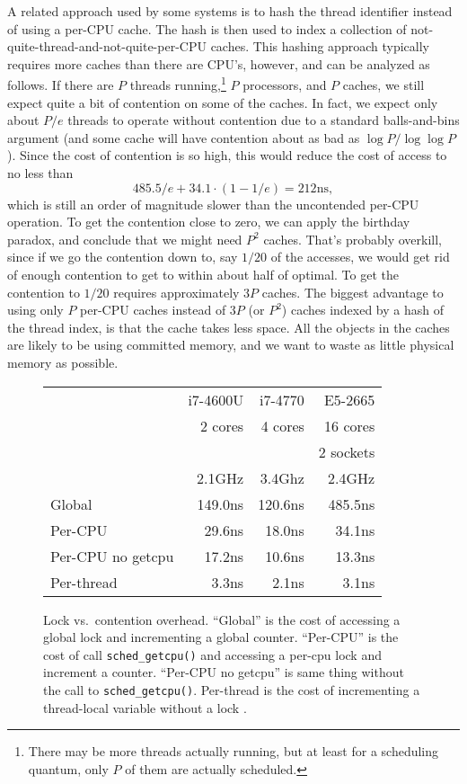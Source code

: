 \documentclass[pldi]{sigplanconf-pldi15}
\newcommand{\code}[1]{\texttt{#1}}
\begin{document}
A related approach used by some systems is to hash the thread
identifier instead of using a per-CPU cache.  The hash is then used to
index a collection of not-quite-thread-and-not-quite-per-CPU caches.
This hashing approach typically requires more caches than there are
CPU's, however, and can be analyzed as follows.  If there are $P$
threads running,\footnote{There may be more threads actually running,
  but at least for a scheduling quantum, only $P$ of them are actually
  scheduled.} $P$ processors, and $P$ caches, we still expect quite a
bit of contention on some of the caches.  In fact, we expect only
about $P/e$ threads to operate without contention due to a standard
balls-and-bins argument (and some cache will have contention about as
bad as $\log P/\log\log P$).  Since the cost of contention is so high,
this would reduce the cost of access to no less than
\[ 485.5/e + 34.1\cdot(1-1/e) = 212\mbox{ns},\]
which is still an order of magnitude slower than the uncontended
per-CPU operation.  To get the contention close to zero, we can apply
the birthday paradox, and conclude that we might need $P^2$ caches.
That's probably overkill, since if we go the contention down to, say
$1/20$ of the accesses, we would get rid of enough contention to get
to within about half of optimal.  To get the contention to $1/20$
requires approximately $3P$ caches.  The biggest advantage to using
only $P$ per-CPU caches instead of $3P$ (or $P^2$) caches indexed by a
hash of the thread index, is that the cache takes less space.  All the
objects in the caches are likely to be using committed memory, and we
want to waste as little physical memory as possible.

\begin{figure}
\begin{tabular}{lrrr}
                             & i7-4600U & i7-4770 &  E5-2665 \\
                             & 2 cores  & 4 cores &  16 cores \\
                             &          &         & 2 sockets \\
                             & 2.1GHz   &  3.4Ghz &  2.4GHz \\ \hline
Global                       &  149.0ns & 120.6ns & 485.5ns \\
Per-CPU                      &   29.6ns &  18.0ns &  34.1ns \\
Per-CPU no getcpu            &   17.2ns &  10.6ns &  13.3ns \\
Per-thread                   &    3.3ns &   2.1ns &   3.1ns \\
\end{tabular}
\caption{Lock vs.~contention overhead.  ``Global'' is the cost of
  accessing a global lock and incrementing a global counter.
  ``Per-CPU'' is the cost of call \code{sched_getcpu()} and accessing
  a per-cpu lock and increment a counter.  ``Per-CPU no getcpu'' is
  same thing without the call to \code{sched_getcpu()}.  Per-thread is
  the cost of incrementing a thread-local variable without a lock .}
\label{fig:overhead}
\end{figure}
\end{document}
